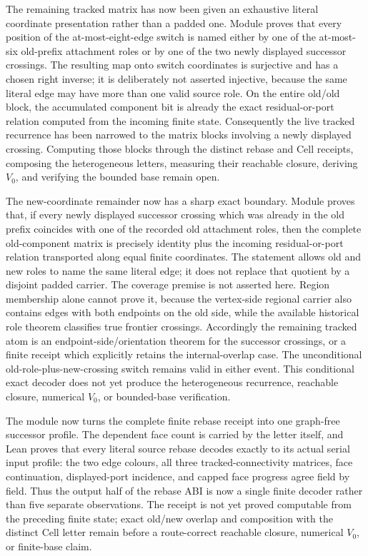 \documentclass[11pt]{article}
\theoremstyle{definition}
\begin{document}
The remaining tracked matrix has now been given an exhaustive literal
coordinate presentation rather than a padded one.  Module
proves that every position of the at-most-eight-edge switch is named either by
one of the at-most-six old-prefix attachment roles or by one of the two newly
displayed successor crossings.  The resulting map onto switch coordinates is
surjective and has a chosen right inverse; it is deliberately not asserted
injective, because the same literal edge may have more than one valid source
role.  On the entire old/old block, the accumulated component bit is already
the exact residual-or-port relation computed from the incoming finite state.
Consequently the live tracked recurrence has been narrowed to the matrix
blocks involving a newly displayed crossing.  Computing those blocks through
the distinct rebase and Cell receipts, composing the heterogeneous letters,
measuring their reachable closure, deriving $V_0$, and verifying the bounded
base remain open.

The new-coordinate remainder now has a sharp exact boundary.  Module
proves that, if every newly displayed successor crossing which was already in
the old prefix coincides with one of the recorded old attachment roles, then
the complete old-component matrix is precisely identity plus the incoming
residual-or-port relation transported along equal finite coordinates.  The
statement allows old and new roles to name the same literal edge; it does not
replace that quotient by a disjoint padded carrier.  The coverage premise is
not asserted here.  Region membership alone cannot prove it, because the
vertex-side regional carrier also contains edges with both endpoints on the
old side, while the available historical role theorem classifies true
frontier crossings.  Accordingly the remaining tracked atom is an
endpoint-side/orientation theorem for the successor crossings, or a finite
receipt which explicitly retains the internal-overlap case.  The unconditional
old-role-plus-new-crossing switch remains valid in either event.  This
conditional exact decoder does not yet produce the heterogeneous recurrence,
reachable closure, numerical $V_0$, or bounded-base verification.

The module
now turns the complete finite rebase receipt into one graph-free successor
profile.  The dependent face count is carried by the letter itself, and Lean
proves that every literal source rebase decodes exactly to its actual serial
input profile: the two edge colours, all three tracked-connectivity matrices,
face continuation, displayed-port incidence, and capped face progress agree
field by field.  Thus the output half of the rebase ABI is now a single
finite decoder rather than five separate observations.  The receipt is not
yet proved computable from the preceding finite state; exact old/new overlap
and composition with the distinct Cell letter remain before a route-correct
reachable closure, numerical $V_0$, or finite-base claim.
\end{document}
